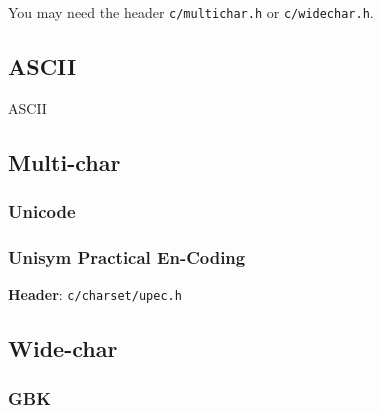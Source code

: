 You may need the header \verb|c/multichar.h| or \verb|c/widechar.h|.



\subsection{ASCII}

{ASCII}



\subsection{Multi-char}



\subsubsection{Unicode}





\subsubsection{Unisym Practical En-Coding}

\textbf{Header}: \verb|c/charset/upec.h|



\subsection{Wide-char}



\subsubsection{GBK}

